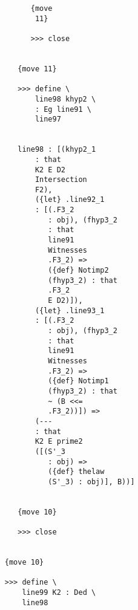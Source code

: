 \documentclass[12pt]{article}
\begin{document}
\begin{verbatim}
                                    {move 
                                     11}

                                    >>> close


                                 {move 11}

                                 >>> define \
                                     line98 khyp2 \
                                     : Eg line91 \
                                     line97


                                 line98 : [(khyp2_1 
                                     : that 
                                     K2 E D2 
                                     Intersection 
                                     F2), 
                                     ({let} .line92_1 
                                     : [(.F3_2 
                                        : obj), (fhyp3_2 
                                        : that 
                                        line91 
                                        Witnesses 
                                        .F3_2) => 
                                        ({def} Notimp2 
                                        (fhyp3_2) : that 
                                        .F3_2 
                                        E D2)]), 
                                     ({let} .line93_1 
                                     : [(.F3_2 
                                        : obj), (fhyp3_2 
                                        : that 
                                        line91 
                                        Witnesses 
                                        .F3_2) => 
                                        ({def} Notimp1 
                                        (fhyp3_2) : that 
                                        ~ (B <<= 
                                        .F3_2))]) => 
                                     (--- 
                                     : that 
                                     K2 E prime2 
                                     ([(S'_3 
                                        : obj) => 
                                        ({def} thelaw 
                                        (S'_3) : obj)], B))]


                                 {move 10}

                                 >>> close


                              {move 10}

                              >>> define \
                                  line99 K2 : Ded \
                                  line98



\end{verbatim}
\end{document}
